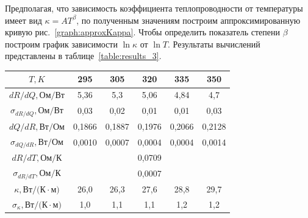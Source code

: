 \documentclass[a4paper, 12pt]{article}
\begin{document}
        \noindent Предполагая, что зависимость коэффициента теплопроводности от температуры имеет вид $\kappa = AT^\beta$, по полученным значениям построим аппроксимированную кривую рис.~\ref{graph:approxKappa}. Чтобы определить показатель степени $\beta$ построим график зависимости $\ln \kappa$ от $\ln T$. Результаты вычислений представлены в таблице~\ref{table:results_3}.
	
        \begin{table}[H]
            \centering
            \begin{tabular}{|c|ccccc|}
                \hline
                $T, K$ & \multicolumn{1}{c|}{295} & \multicolumn{1}{c|}{305} & \multicolumn{1}{c|}{320} & \multicolumn{1}{c|}{335} & 350 \\ \hline
                
                $dR/dQ, \text{Ом/Вт}$ & \multicolumn{1}{c|}{5,36} & \multicolumn{1}{c|}{5,3} & \multicolumn{1}{c|}{5,06} & \multicolumn{1}{c|}{4,84} & 4,7 \\ \hline
                
                $\sigma_{dR/dQ}, \text{Ом/Вт}$ & \multicolumn{1}{c|}{0,03} & \multicolumn{1}{c|}{0,02} & \multicolumn{1}{c|}{0,01} & \multicolumn{1}{c|}{0,01} & 0,03 \\ \hline
                
                $dQ/dR, \text{Вт/Ом}$ & \multicolumn{1}{c|}{0,1866} & \multicolumn{1}{c|}{0,1887} & \multicolumn{1}{c|}{0,1976} & \multicolumn{1}{c|}{0,2066} & 0,2128 \\ \hline
                
                $\sigma_{dQ/dR}, \text{Вт/Ом}$ & \multicolumn{1}{c|}{0,0010} & \multicolumn{1}{c|}{0,0007} & \multicolumn{1}{c|}{0,0004} & \multicolumn{1}{c|}{0,0004} & 0,0014 \\ \hline
                
                $dR/dT, \text{Ом/К}$ & \multicolumn{5}{c|}{0,0709} \\ \hline
                $\sigma_{dR/dT}, \text{Ом/К}$ & \multicolumn{5}{c|}{0,0007} \\ \hline
                
                $\kappa, \text{Вт/(К} \cdot \text{м)}$ & \multicolumn{1}{c|}{26,0} & \multicolumn{1}{c|}{26,3} & \multicolumn{1}{c|}{27,6} & \multicolumn{1}{c|}{28,8} & 29,7 \\ \hline
                
                $\sigma_\kappa, \text{Вт/(К} \cdot \text{м)}$ & \multicolumn{1}{c|}{1,0} & \multicolumn{1}{c|}{1,1} & \multicolumn{1}{c|}{1,1} & \multicolumn{1}{c|}{1,2} & 1,2 \\ \hline
                

\end{tabular}
\end{table}
\end{document}
